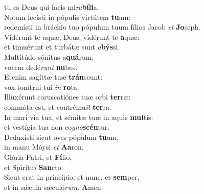 \oddverse tu es Deus qui facis mi\textit{ra}\textbf{bí}\textbf{li}a.\\
\evenverse Notam fecísti in pópulis virtútem \textbf{tu}am:~\*\\
\evenverse redemísti in bráchio tuo pópulum tuum fílios Jacob \textit{et} \textbf{Jo}seph.\\
\oddverse Vidérunt te aquæ, Deus, vidérunt te \textbf{a}quæ:~\*\\
\oddverse et timuérunt et turbátæ sunt \textit{a}\textbf{býs}si.\\
\evenverse Multitúdo sónitus a\textbf{quá}rum:~\*\\
\evenverse vocem dedé\textit{runt} \textbf{nu}bes.\\
\oddverse Etenim sagíttæ tuæ \textbf{trán}seunt:~\*\\
\oddverse vox tonítrui tui \textit{in} \textbf{ro}ta.\\
\evenverse Illuxérunt coruscatiónes tuæ orbi \textbf{ter}ræ:~\*\\
\evenverse commóta est, et contrému\textit{it} \textbf{ter}ra.\\
\oddverse In mari via tua, et sémitæ tuæ in aquis \textbf{mul}tis:~\*\\
\oddverse et vestígia tua non co\textit{gno}\textbf{scén}tur.\\
\evenverse Deduxísti sicut oves pópulum \textbf{tu}um,~\*\\
\evenverse in manu Móysi \textit{et} \textbf{A}\textbf{a}ron.\\
\oddverse Glória Patri, et \textbf{Fí}lio,~\*\\
\oddverse et Spirítu\textit{i} \textbf{San}cto.\\
\evenverse Sicut erat in princípio, et nunc, et \textbf{sem}per,~\*\\
\evenverse et in sǽcula sæculó\textit{rum}. \textbf{A}men.\\
